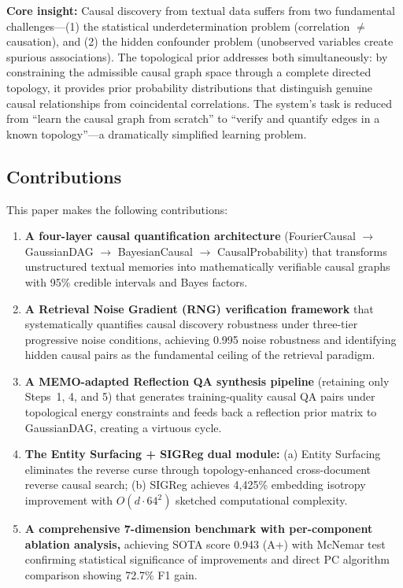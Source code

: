 \documentclass[11pt,a4paper]{article}
\begin{document}
\textbf{Core insight:} Causal discovery from textual data suffers from two fundamental challenges---(1) the statistical underdetermination problem (correlation \(\neq\) causation), and (2) the hidden confounder problem (unobserved variables create spurious associations). The topological prior addresses both simultaneously: by constraining the admissible causal graph space through a complete directed topology, it provides prior probability distributions that distinguish genuine causal relationships from coincidental correlations. The system's task is reduced from ``learn the causal graph from scratch'' to ``verify and quantify edges in a known topology''---a dramatically simplified learning problem.

\subsection{Contributions}

This paper makes the following contributions:

\begin{enumerate}[leftmargin=*,itemsep=2pt]
    \item \textbf{A four-layer causal quantification architecture} (FourierCausal \(\to\) GaussianDAG \(\to\) BayesianCausal \(\to\) CausalProbability) that transforms unstructured textual memories into mathematically verifiable causal graphs with 95\% credible intervals and Bayes factors.
    \item \textbf{A Retrieval Noise Gradient (RNG) verification framework} that systematically quantifies causal discovery robustness under three-tier progressive noise conditions, achieving 0.995 noise robustness and identifying hidden causal pairs as the fundamental ceiling of the retrieval paradigm.
    \item \textbf{A MEMO-adapted Reflection QA synthesis pipeline} (retaining only Steps~1, 4, and 5) that generates training-quality causal QA pairs under topological energy constraints and feeds back a reflection prior matrix to GaussianDAG, creating a virtuous cycle.
    \item \textbf{The Entity Surfacing + SIGReg dual module:} (a) Entity Surfacing eliminates the reverse curse through topology-enhanced cross-document reverse causal search; (b) SIGReg achieves 4,425\% embedding isotropy improvement with \(O(d \cdot 64^2)\) sketched computational complexity.
    \item \textbf{A comprehensive 7-dimension benchmark with per-component ablation analysis,} achieving SOTA score 0.943 (A+) with McNemar test confirming statistical significance of improvements and direct PC algorithm comparison showing 72.7\% F1 gain.
\end{enumerate}
\end{document}
